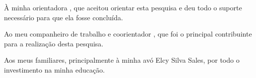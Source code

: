 
\begin{agradecimentos}

    À minha orientadora \imprimirorientador, que aceitou orientar esta pesquisa e deu todo o suporte necessário para que ela fosse concluída.

    Ao meu companheiro de trabalho e coorientador \coexaminador, que foi o principal contribuinte para a realização desta pesquisa.
    
    Aos meus familiares, principalmente à minha avó Elcy Silva Sales, por todo o investimento na minha educação.

\end{agradecimentos}